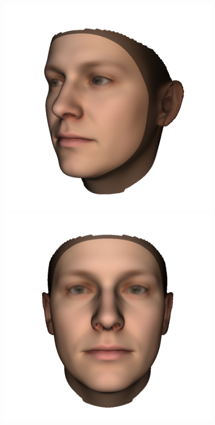 \begin{figure}
    \centering
    \begin{minipage}{.32\textwidth}
        \centering
        \includegraphics[width=\textwidth]{Figures/Pictures/sideA_t.png}
      \end{minipage}
      \begin{minipage}{.33\textwidth}
          \centering
          \includegraphics[width=\textwidth]{Figures/Pictures/face_bfm_close_t.png}

\end{minipage}
\end{figure}
